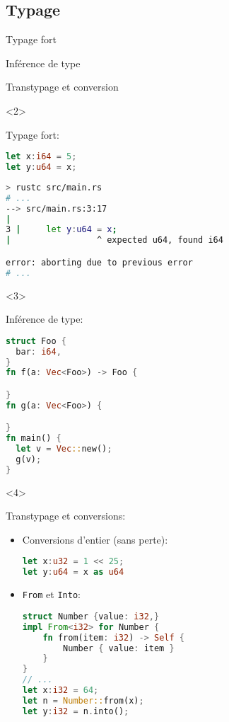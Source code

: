 
\begin{frame}
\end{frame}
\subsection{Typage}
\begin{frame}[fragile]
  \begin{itemize}
     {
    \item Typage fort
    \item Inférence de type
    \item Transtypage et conversion
    }
    \begin{onlyenv}<2>
    \item Typage fort:
      \begin{lstlisting}[language=Rust]
let x:i64 = 5;
let y:u64 = x;
      \end{lstlisting}
      \begin{lstlisting}[language=bash]
> rustc src/main.rs
# ...
--> src/main.rs:3:17
|
3 |     let y:u64 = x;
|                 ^ expected u64, found i64

error: aborting due to previous error
# ...
      \end{lstlisting}
    \end{onlyenv}
    \begin{onlyenv}<3>
    \item Inférence de type:
      \begin{lstlisting}[language=Rust]
struct Foo {
  bar: i64,
}
fn f(a: Vec<Foo>) -> Foo {

}
fn g(a: Vec<Foo>) {

}
fn main() {
  let v = Vec::new();
  g(v);
}
      \end{lstlisting}
    \end{onlyenv}
    \begin{onlyenv}<4>
    \item Transtypage et conversions:
      \begin{itemize}
      \item Conversions d'entier (sans perte):
      \begin{lstlisting}[language=Rust]
let x:u32 = 1 << 25;
let y:u64 = x as u64
      \end{lstlisting}
      \item \texttt{From} et \texttt{Into}:
      \begin{lstlisting}[language=Rust]
struct Number {value: i32,}
impl From<i32> for Number {
    fn from(item: i32) -> Self {
        Number { value: item }
    }
}
// ...
let x:i32 = 64;
let n = Number::from(x);
let y:i32 = n.into();
      \end{lstlisting}
      \end{itemize}
    \end{onlyenv}
  \end{itemize}
\end{frame}
